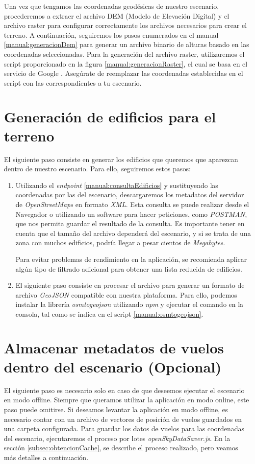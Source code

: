\documentclass[a4paper, 11pt]{book}
\begin{document}
Una vez que tengamos las coordenadas geodésicas de nuestro escenario, procederemos a extraer el archivo DEM (Modelo de Elevación Digital) y el archivo raster para configurar correctamente los archivos necesarios para crear el terreno. A continuación, seguiremos los pasos enumerados en el manual \ref{manual:generacionDem} para generar un archivo binario de alturas basado en las coordenadas seleccionadas. Para la generación del archivo raster, utilizaremos el script proporcionado en la figura \ref{manual:generacionRaster}, el cual se basa en el servicio de Google \cite{googleearthengine}. Asegúrate de reemplazar las coordenadas establecidas en el script con las correspondientes a tu escenario.

\section{Generación de edificios para el terreno}
El siguiente paso consiste en generar los edificios que queremos que aparezcan dentro de nuestro escenario. Para ello, seguiremos estos pasos:

\begin{enumerate}
    \item Utilizando el \emph{endpoint} \ref{manual:consultaEdificios} y sustituyendo las coordenadas por las del escenario, descargaremos los metadatos del servidor de \emph{OpenStreetMaps} en formato \emph{XML}. Esta consulta se puede realizar desde el Navegador o utilizando un software para hacer peticiones, como \emph{POSTMAN}, que nos permita guardar el resultado de la consulta. Es importante tener en cuenta que el tamaño del archivo dependerá del escenario, y si se trata de una zona con muchos edificios, podría llegar a pesar cientos de \emph{Megabytes}. 
    
    Para evitar problemas de rendimiento en la aplicación, se recomienda aplicar algún tipo de filtrado adicional para obtener una lista reducida de edificios.
    \item El siguiente paso consiste en procesar el archivo para generar un formato de archivo \emph{GeoJSON} compatible con nuestra plataforma. Para ello, podemos instalar la librería \emph{osmtogeojson} utilizando \emph{npm} y ejecutar el comando en la consola, tal como se indica en el script \ref{manual:osmtogeojson}.
\end{enumerate}
\section{Almacenar metadatos de vuelos dentro del escenario (Opcional)}
El siguiente paso es necesario solo en caso de que deseemos ejecutar el escenario en modo offline. Siempre que queramos utilizar la aplicación en modo online, este paso puede omitirse.
Si deseamos levantar la aplicación en modo offline, es necesario contar con un archivo de vectores de posición de vuelos guardados en una carpeta configurada. Para guardar los datos de vuelos para las coordenadas del escenario, ejecutaremos el proceso por lotes \emph{openSkyDataSaver.js}. En la sección \ref{subsec:obtencionCache}, se describe el proceso realizado, pero veamos más detalles a continuación.
\end{document}
